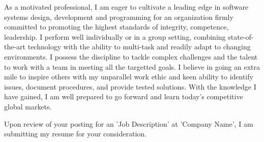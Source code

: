 \documentclass[11pt, a4paper]{awesome-cv}
\begin{document}
\begin{cvletter}
As a motivated professional, I am eager to cultivate a leading edge in software systems design, development and programming for an organization firmly committed to promoting the highest standards of integrity, competence, leadership. I perform well individually or in a group setting, combining state-of-the-art technology with the ability to multi-task and readily adapt to changing environments. I possess the discipline to tackle complex challenges and the talent to work with a team in meeting all the targetted goals. I believe in going an extra mile to inspire others with my unparallel work ethic and keen ability to identify issues, document procedures, and provide tested solutions. With the knowledge I have gained, I am well prepared to go forward and learn today's competitive global markets.

Upon review of your posting for an 'Job Description' at 'Company Name', I am submitting my resume for your consideration.

\end{cvletter}

\makeletterclosing
\end{document}
